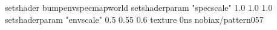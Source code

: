 setshader bumpenvspecmapworld
setshaderparam "specscale" 1.0 1.0 1.0
setshaderparam "envscale"  0.5 0.55 0.6
texture 0ns nobiax/pattern057